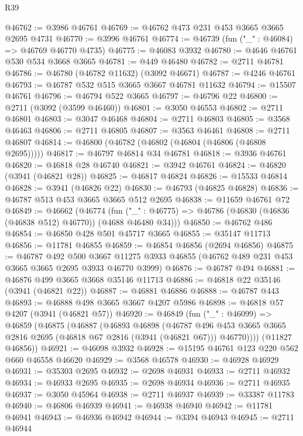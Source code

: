 \begin{lexlean}{R39}
\begin{coremodule}
@46762 := @3986 @46761
@46769 := @46762 @473 @231 @453 @3665 @3665 @2695 @4731
@46770 := @3996 @46761
@46774 := @46739 (fun ("_" : @46084) => @46769 @46770 @4735)
@46775 := @46083 @3932
@46780 := @4646 @46761 @530 @534 @3668 @3665
@46781 := @449 @46480
@46782 := @2711 @46781
@46786 := @46780 (@46782 @11632) (@3092 @46671)
@46787 := @4246 @46761
@46793 := @46787 @532 @515 @3665 @3667 @46781 @11632
@46794 := @15507 @46761
@46796 := @46794 @522 @3665
@46797 := @46796 @22
@46800 := @2711 (@3092 (@3599 @46460))
@46801 := @3050 @46553
@46802 := @2711 @46801
@46803 := @3047 @46468
@46804 := @2711 @46803
@46805 := @3568 @46463
@46806 := @2711 @46805
@46807 := @3563 @46461
@46808 := @2711 @46807
@46814 := @46800 (@46782 (@46802 (@46804 (@46806 (@46808 @2695)))))
@46817 := @46797 @46814 @34 @46781
@46818 := @3936 @46761
@46820 := @46818 @28 @46740
@46821 := @3942 @46761
@46824 := @46820 (@3941 (@46821 @28))
@46825 := @46817 @46824
@46826 := @15533 @46814
@46828 := @3941 (@46826 @22)
@46830 := @46793 (@46825 @46828)
@46836 := @46787 @513 @453 @3665 @3665 @512 @2695
@46838 := @11659 @46761 @72
@46849 := @46662
    (@46774
      (fun ("_" : @46775) => @46786 (@46830 (@46836 (@46838 @512) @46770)) (@4688 @46480 @34)))
@46850 := @46762 @486
@46854 := @46850 @428 @501 @45717 @3665
@46855 := @35147 @11713
@46856 := @11781 @46855
@46859 := @46854 @46856 (@2694 @46856)
@46875 := @46787
    @492
    @500
    @3667
    @11275
    @3933
    @46855
    (@46762 @489 @231 @453 @3665 @3665 @2695 @3933 @46770 @3999)
@46876 := @46787 @494
@46881 := @46876 @499 @3665 @3668 @35146 @11713
@46886 := @46818 @22 @35146 (@3941 (@46821 @22))
@46887 := @46881 @46886
@46888 := @46787 @443
@46893 := @46888 @498 @3665 @3667 @4207 @5986
@46898 := @46818 @57 @4207 (@3941 (@46821 @57))
@46920 := @46849
    (fun ("_" : @46099) =>
    @46859
      (@46875
        (@46887
          (@46893
            @46898
            (@46787
              @496
              @453
              @3665
              @3665
              @2816
              @2695
              (@46818 @67 @2816 (@3941 (@46821 @67)))
              @46770))))
      (@11827 @46856))
@46921 := @46098 @3932
@46928 := @15195 @46761 @123 @220 @562 @660 @46558 @46620
@46929 := @3568 @46578
@46930 := @46928 @46929
@46931 := @35303 @2695
@46932 := @2698 @46931
@46933 := @2711 @46932
@46934 := @46933 @2695
@46935 := @2698 @46934
@46936 := @2711 @46935
@46937 := @3050 @45964
@46938 := @2711 @46937
@46939 := @33387 @11783
@46940 := @46806 @46939
@46941 := @46938 @46940
@46942 := @11781 @46941
@46943 := @46936 @46942
@46944 := @3394 @46943
@46945 := @2711 @46944

\end{coremodule}
\end{lexlean}

